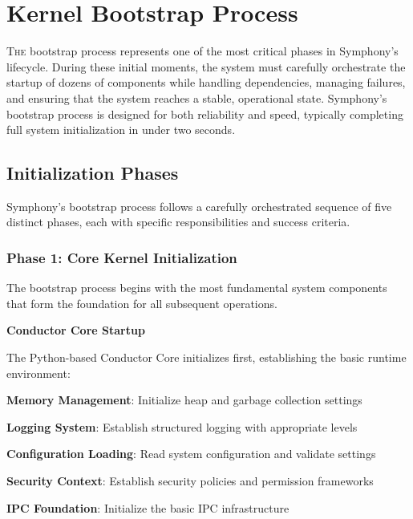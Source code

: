 
\section{Kernel Bootstrap Process}
\label{sec:kernel-bootstrap}

\lettrine{T}{he} bootstrap process represents one of the most critical phases in Symphony's lifecycle. During these initial moments, the system must carefully orchestrate the startup of dozens of components while handling dependencies, managing failures, and ensuring that the system reaches a stable, operational state. Symphony's bootstrap process is designed for both reliability and speed, typically completing full system initialization in under two seconds.

\subsection{Initialization Phases}
\label{subsec:initialization-phases}

Symphony's bootstrap process follows a carefully orchestrated sequence of five distinct phases, each with specific responsibilities and success criteria.

\subsubsection{Phase 1: Core Kernel Initialization}

The bootstrap process begins with the most fundamental system components that form the foundation for all subsequent operations.

\textbf{Conductor Core Startup}

The Python-based Conductor Core initializes first, establishing the basic runtime environment:

\begin{compactlist}
    \item \textbf{Memory Management}: Initialize heap and garbage collection settings
    \item \textbf{Logging System}: Establish structured logging with appropriate levels
    \item \textbf{Configuration Loading}: Read system configuration and validate settings
    \item \textbf{Security Context}: Establish security policies and permission frameworks
    \item \textbf{IPC Foundation}: Initialize the basic IPC infrastructure
\end{compactlist}

